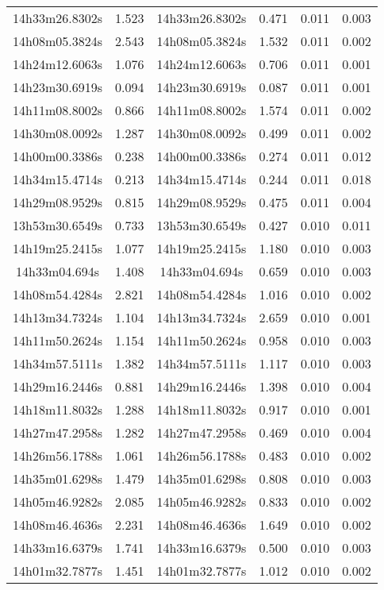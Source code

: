 \begin{table}
\begin{tabular}{cccccc}
14h33m26.8302s & 1.523 & 14h33m26.8302s & 0.471 & 0.011 & 0.003 \\
14h08m05.3824s & 2.543 & 14h08m05.3824s & 1.532 & 0.011 & 0.002 \\
14h24m12.6063s & 1.076 & 14h24m12.6063s & 0.706 & 0.011 & 0.001 \\
14h23m30.6919s & 0.094 & 14h23m30.6919s & 0.087 & 0.011 & 0.001 \\
14h11m08.8002s & 0.866 & 14h11m08.8002s & 1.574 & 0.011 & 0.002 \\
14h30m08.0092s & 1.287 & 14h30m08.0092s & 0.499 & 0.011 & 0.002 \\
14h00m00.3386s & 0.238 & 14h00m00.3386s & 0.274 & 0.011 & 0.012 \\
14h34m15.4714s & 0.213 & 14h34m15.4714s & 0.244 & 0.011 & 0.018 \\
14h29m08.9529s & 0.815 & 14h29m08.9529s & 0.475 & 0.011 & 0.004 \\
13h53m30.6549s & 0.733 & 13h53m30.6549s & 0.427 & 0.010 & 0.011 \\
14h19m25.2415s & 1.077 & 14h19m25.2415s & 1.180 & 0.010 & 0.003 \\
14h33m04.694s & 1.408 & 14h33m04.694s & 0.659 & 0.010 & 0.003 \\
14h08m54.4284s & 2.821 & 14h08m54.4284s & 1.016 & 0.010 & 0.002 \\
14h13m34.7324s & 1.104 & 14h13m34.7324s & 2.659 & 0.010 & 0.001 \\
14h11m50.2624s & 1.154 & 14h11m50.2624s & 0.958 & 0.010 & 0.003 \\
14h34m57.5111s & 1.382 & 14h34m57.5111s & 1.117 & 0.010 & 0.003 \\
14h29m16.2446s & 0.881 & 14h29m16.2446s & 1.398 & 0.010 & 0.004 \\
14h18m11.8032s & 1.288 & 14h18m11.8032s & 0.917 & 0.010 & 0.001 \\
14h27m47.2958s & 1.282 & 14h27m47.2958s & 0.469 & 0.010 & 0.004 \\
14h26m56.1788s & 1.061 & 14h26m56.1788s & 0.483 & 0.010 & 0.002 \\
14h35m01.6298s & 1.479 & 14h35m01.6298s & 0.808 & 0.010 & 0.003 \\
14h05m46.9282s & 2.085 & 14h05m46.9282s & 0.833 & 0.010 & 0.002 \\
14h08m46.4636s & 2.231 & 14h08m46.4636s & 1.649 & 0.010 & 0.002 \\
14h33m16.6379s & 1.741 & 14h33m16.6379s & 0.500 & 0.010 & 0.003 \\
14h01m32.7877s & 1.451 & 14h01m32.7877s & 1.012 & 0.010 & 0.002 \\

\end{tabular}
\end{table}

